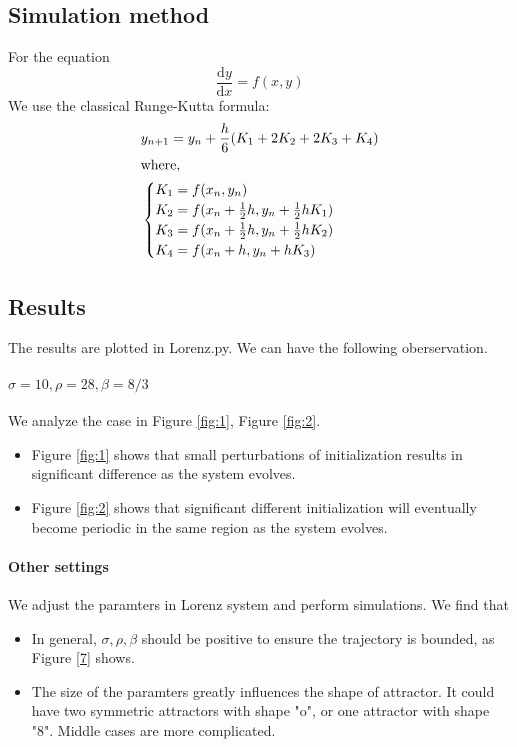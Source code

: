 \documentclass[conference,onecolumn,12pt]{IEEEtran}
\renewcommand{\d}{\mathrm{d}}
\begin{document}
\subsection{Simulation method}
For the equation
\begin{equation}
    \frac{\d y}{\d x} = f(x,y)
\end{equation}
We use the classical Runge-Kutta formula:
\begin{equation}
    \begin{split}
        &y_{n+1} =y_n+\frac{h}{6}(K_1+2K_2+2K_3+K_4)\\
        &{\rm where},\\
        &\begin{cases}
            K_1 = f(x_n,y_n)\\
            K_2 = f(x_n+\frac{1}{2}h,y_n+\frac{1}{2}hK_1)\\
            K_3 = f(x_n+\frac{1}{2}h,y_n+\frac{1}{2}hK_2)\\
            K_4 = f(x_n+h,y_n+hK_3)\\
        \end{cases}
    \end{split}
\end{equation}


\subsection{Results}
The results are plotted in Lorenz.py. We can have the following oberservation.
\paragraph{$\sigma = 10, \rho=28, \beta=8/3$} We analyze the case in Figure \ref{fig:1}, Figure \ref{fig:2}.
\begin{itemize}
    \item Figure \ref{fig:1} shows that small perturbations of initialization results in significant difference as the system evolves. 
    \item Figure \ref{fig:2} shows that significant different initialization will eventually become periodic in the same region as the system evolves. 
\end{itemize}

\paragraph{Other settings}
We adjust the paramters in Lorenz system and perform simulations. We find that
\begin{itemize}
    \item In general, $\sigma, \rho, \beta$ should be positive to ensure the trajectory is bounded, as Figure \ref{7} shows.
    \item The size of the paramters greatly influences the shape of attractor. It could have two symmetric attractors with shape "o", or one attractor with shape "8". Middle cases are more complicated. 
\end{itemize}
\end{document}
